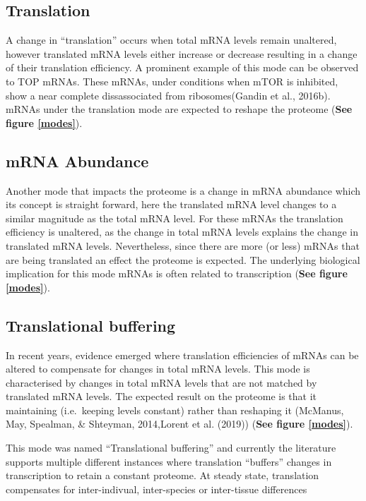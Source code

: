 \documentclass[12pt,openany]{book}
\begin{document}
\subsection{Translation}

A change in ``translation'' occurs when total mRNA levels remain
unaltered, however translated mRNA levels either increase or decrease
resulting in a change of their translation efficiency. A prominent
example of this mode can be observed to TOP mRNAs. These mRNAs, under
conditions when mTOR is inhibited, show a near complete dissassociated
from ribosomes(Gandin et al., 2016b). mRNAs under the translation mode
are expected to reshape the proteome (\textbf{See figure \ref{modes}}).

\subsection{mRNA Abundance}

Another mode that impacts the proteome is a change in mRNA abundance
which its concept is straight forward, here the translated mRNA level
changes to a similar magnitude as the total mRNA level. For these mRNAs
the translation efficiency is unaltered, as the change in total mRNA
levels explains the change in translated mRNA levels. Nevertheless,
since there are more (or less) mRNAs that are being translated an effect
the proteome is expected. The underlying biological implication for this
mode mRNAs is often related to transcription (\textbf{See figure
\ref{modes}}).

\subsection{Translational buffering} \label{modeBuffering}

In recent years, evidence emerged where translation efficiencies of
mRNAs can be altered to compensate for changes in total mRNA levels.
This mode is characterised by changes in total mRNA levels that are not
matched by translated mRNA levels. The expected result on the proteome
is that it maintaining (i.e.~keeping levels constant) rather than
reshaping it (McManus, May, Spealman, \& Shteyman, 2014,Lorent et al.
(2019)) (\textbf{See figure \ref{modes}}).

This mode was named ``Translational buffering'' and currently the
literature supports multiple different instances where translation
``buffers'' changes in transcription to retain a constant proteome. At
steady state, translation compensates for inter-indivual, inter-species
or inter-tissue differences
\end{document}
